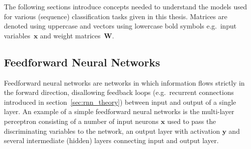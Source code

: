 The following sections introduce concepts needed to understand the models used
for various (sequence) classification tasks given in this thesis. Matrices are
denoted using uppercase and vectors using lowercase bold symbols e.g.\ input
variables~$\mathbf{x}$ and weight matrices~$\mathbf{W}$.

\subsection{Feedforward Neural Networks}
\label{sec:nn_feedforward}
Feedforward neural networks are networks in which information flows strictly in
the forward direction, disallowing feedback loops (e.g.\ recurrent connections
introduced in section~\ref{sec:rnn_theory}) between input and output of a single
layer. An example of a simple feedforward neural networks is the multi-layer
perceptron consisting of a number of input neurons $\mathbf{x}$ used to pass the
discriminating variables to the network, an output layer with activation
$\mathbf{y}$ and several intermediate (hidden) layers connecting input and
output layer.
